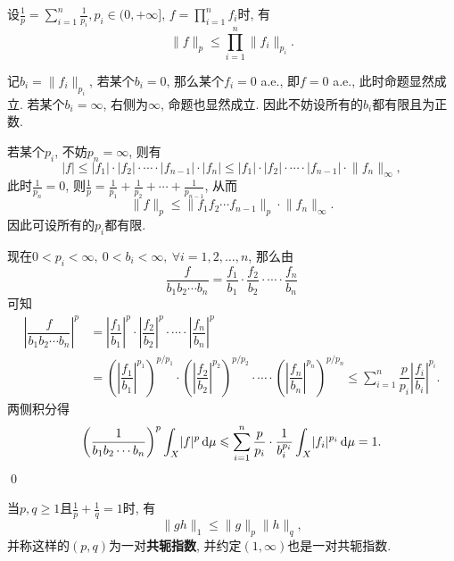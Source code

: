 	\begin{Proposition}[H\"older]
			设$ \frac{1}{p}=\sum\limits_{i=1}^n\frac{1}{p_i}, p_{i}\in(0, +\infty] $, $ f=\prod\limits_{i=1}^nf_i $时, 有
			\[
			\lVert f\rVert_p\leqslant\prod_{i=1}^n\lVert f_i\rVert_{p_i}.
			\]
	\end{Proposition}
	\begin{Proof}
			记$ b_i=\lVert f_i\rVert_{p_i} $, 若某个$ b_i=0 $, 那么某个$ f_i=0 $ a.e., 即$ f=0 $ a.e., 此时命题显然成立. 若某个$ b_i=\infty $, 右侧为$ \infty $, 命题也显然成立. 因此不妨设所有的$ b_i $都有限且为正数.

			若某个$ p_i $, 不妨$ p_n=\infty $, 则有
			\[
			\lvert f\rvert\leqslant\lvert f_1\rvert\cdot\lvert f_2\rvert\cdot\cdots\cdot\lvert f_{n-1}\rvert\cdot\lvert f_n\rvert\leqslant \lvert f_1\rvert\cdot\lvert f_2\rvert\cdot\cdots\cdot\lvert f_{n-1}\rvert\cdot\lVert f_n\rVert_\infty,
			\]
			此时$ \frac{1}{p_n}=0 $, 则$ \frac{1}{p}=\frac{1}{p_1}+\frac{1}{p_2}+\cdots+\frac{1}{p_{n-1}} $, 从而
			\[
			\lVert f\rVert_p\leqslant\lVert f_1f_2\cdots f_{n-1}\rVert_p\cdot\lVert f_n\rVert_\infty.
			\]
			因此可设所有的$ p_i $都有限.

			现在$ 0<p_i<\infty,\ 0<b_i<\infty,\ \forall i=1,2, \dots,n $, 那么由
			\[
			\dfrac{f}{b_1b_2\cdots b_n}=\dfrac{f_1}{b_1}\cdot\dfrac{f_2}{b_2}\cdot\cdots\cdot\dfrac{f_n}{b_n}
			\]
			可知
			\begin{align*}
			\left| \dfrac{f}{b_1b_2\cdots b_n} \right|^p&=\left| \dfrac{f_1}{b_1} \right|^p\cdot\left| \dfrac{f_2}{b_2} \right|^p\cdot\cdots\cdot\left| \dfrac{f_n}{b_n} \right|^p\\
			&=\left(\left| \dfrac{f_1}{b_1} \right|^{p_1}\right)^{p/p_1}\cdot\left(\left| \dfrac{f_2}{b_2} \right|^{p_2}\right)^{p/p_2}\cdot\cdots\cdot\left(\left| \dfrac{f_n}{b_n} \right|^{p_n}\right)^{p/p_n}\leqslant\sum_{i=1}^n\dfrac{p}{p_i}\left| \dfrac{f_i}{b_i} \right|^{p_i}.
			\end{align*}
		两侧积分得
			\[
			\left(\dfrac{1}{b_1b_2\cdots b_n}\right)^p\int_X\lvert f\rvert^p\,\mathrm{d}\mu\leqslant\sum_{i=1}^n\dfrac{p}{p_i}\cdot\dfrac{1}{b_i^{p_i}}\int_X\lvert f_i\rvert^{p_i}\,\mathrm{d}\mu=1.
			\]\qed
	\end{Proof}

	\begin{Corollary}[H\"older]
			当$ p,q\geqslant 1 $且$ \frac{1}{p}+\frac{1}{q}=1 $时, 有
			\[
			\lVert gh\rVert_1\leqslant\lVert g\rVert_p\lVert h\rVert_q,
			\]
			并称这样的$ (p,q) $为一对\textbf{共轭指数}, 并约定$ (1,\infty) $也是一对共轭指数.
	\end{Corollary}

